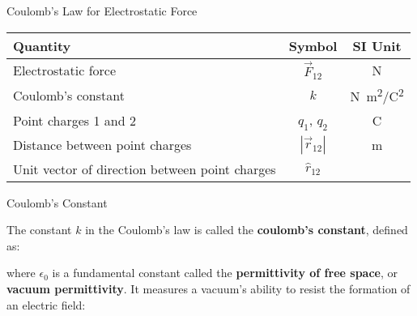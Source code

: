 \documentclass[12pt,aspectratio=169]{beamer}
\begin{document}
\begin{frame}{Coulomb's Law for Electrostatic Force}
  \begin{center}
    \begin{tabular}{l|c|c}
      \rowcolor{pink}
      \textbf{Quantity} & \textbf{Symbol} & \textbf{SI Unit} \\ \hline
      Electrostatic force    & $\vec F_{12}$ & \si\newton \\
      Coulomb's constant     & $k$          & \si{N.m^2/C^2} \\
      Point charges 1 and 2  & $q_1$, $q_2$ &  \si\coulomb \\
      Distance between point charges & $|\vec r_{12}|$ & \si\metre \\
      Unit vector of direction between point charges & $\hat r_{12}$ &
    \end{tabular}
  \end{center}
\end{frame}



\begin{frame}{Coulomb's Constant}


  The constant $k$ in the Coulomb's law is called the
  \textbf{coulomb's constant}, defined as:


  where $\epsilon_0$ is a fundamental constant called the
  \textbf{permittivity of free space}, or \textbf{vacuum permittivity}. It
  measures a vacuum's ability to resist the formation of an electric field:

\end{frame}
\end{document}
